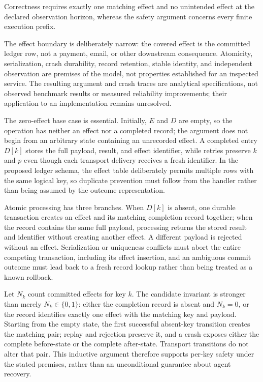 \documentclass[11pt]{article}
\begin{document}
Correctness requires exactly one matching effect and no unintended effect at the declared observation horizon, whereas the safety argument concerns every finite execution prefix.

The effect boundary is deliberately narrow: the covered effect is the committed ledger row, not a payment, email, or other downstream consequence. Atomicity, serialization, crash durability, record retention, stable identity, and independent observation are premises of the model, not properties established for an inspected service. The resulting argument and crash traces are analytical specifications, not observed benchmark results or measured reliability improvements; their application to an implementation remains unresolved.

The zero-effect base case is essential. Initially, $E$ and $D$ are empty, so the operation has neither an effect nor a completed record; the argument does not begin from an arbitrary state containing an unrecorded effect. A completed entry $D[k]$ stores the full payload, result, and effect identifier, while retries preserve $k$ and $p$ even though each transport delivery receives a fresh identifier. In the proposed ledger schema, the effect table deliberately permits multiple rows with the same logical key, so duplicate prevention must follow from the handler rather than being assumed by the outcome representation.

Atomic processing has three branches. When $D[k]$ is absent, one durable transaction creates an effect and its matching completion record together; when the record contains the same full payload, processing returns the stored result and identifier without creating another effect. A different payload is rejected without an effect. Serialization or uniqueness conflicts must abort the entire competing transaction, including its effect insertion, and an ambiguous commit outcome must lead back to a fresh record lookup rather than being treated as a known rollback.

Let $N_k$ count committed effects for key $k$. The candidate invariant is stronger than merely $N_k\in\{0,1\}$: either the completion record is absent and $N_k=0$, or the record identifies exactly one effect with the matching key and payload. Starting from the empty state, the first successful absent-key transition creates the matching pair; replay and rejection preserve it, and a crash exposes either the complete before-state or the complete after-state. Transport transitions do not alter that pair. This inductive argument therefore supports per-key safety under the stated premises, rather than an unconditional guarantee about agent recovery.
\end{document}
